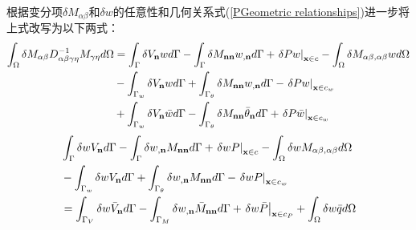 根据变分项$\delta M_{\alpha\beta}$和$\delta w$的任意性和几何关系式(\ref{PGeometric relationships})进一步将上式改写为以下两式：
\begin{equation}\label{Pweakform1}
    \begin{split}
        \int_\Omega {\delta {M_{\alpha \beta }}D_{\alpha \beta \gamma \eta }^{ - 1}{M_{\gamma \eta }}d\Omega }&=\int_\Gamma  {\delta {V_{\bf{n}}}wd\Gamma }  - \int_\Gamma  {\delta {M_{{\bf{nn}}}}{w_{,{\bf{n}}}}d\Gamma }+{\left. {\delta Pw} \right|_{{\bf{x}} \in c}} - \int_\Omega  {\delta {M_{\alpha \beta ,\alpha \beta }}wd\Omega } \\
        &-\int_{{\Gamma _w}} {\delta {V_{\bf{n}}}wd\Gamma }  + \int_{{\Gamma _\theta }} {\delta {M_{{\bf{nn}}}}{w_{,{\bf{n}}}}d\Gamma }  - {\left. {\delta Pw} \right|_{{\bf{x}} \in {c_w}}}\\
        &+\int_{{\Gamma _w}} {\delta {V_{\bf{n}}}\bar wd\Gamma }  - \int_{{\Gamma _\theta }} {\delta {M_{{\bf{nn}}}}{{\bar \theta }_{\bf{n}}}d\Gamma }  + {\left. {\delta P\bar w} \right|_{{\bf{x}} \in {c_w}}}
    \end{split}
\end{equation}
\begin{equation}
        \begin{split}\label{Pweakform2}
            &\int_\Gamma  {\delta w{V_{\bf{n}}}d\Gamma } - \int_\Gamma  {\delta {w_{,{\bf{n}}}}{M_{{\bf{nn}}}}d\Gamma }  + {\left. {\delta wP} \right|_{{\bf{x}} \in c}} - \int_\Omega  {\delta w{M_{\alpha \beta ,\alpha\beta}}d\Omega }\\
            &- \int_{{\Gamma _w}} {\delta w{V_{\bf{n}}}d\Gamma }  + \int_{{\Gamma _\theta }} {\delta {w_{,{\bf{n}}}}{M_{{\bf{nn}}}}d\Gamma }  - {\left. {\delta wP} \right|_{{\bf{x}} \in {c_w}}}\\
            &= \int_{{\Gamma _V}} {\delta w{{\bar V}_{\bf{n}}}d\Gamma }  - \int_{{\Gamma _M}} {\delta {w_{,{\bf{n}}}}{{\bar M}_{{\bf{nn}}}}d\Gamma }  + {\left. {\delta w\bar P} \right|_{{\bf{x}} \in {c_P}}} + \int_\Omega  {\delta w\bar qd\Omega} 
    \end{split}
\end{equation} 
